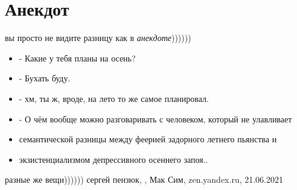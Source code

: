  
 
 
 
 
\chapter{Анекдот}
\label{sec:slova.anekdot}

вы просто не видите разницу
как в \emph{анекдоте}))))))
\begin{itemize}
  \item - Какие у тебя планы на осень?
  \item - Бухать буду.
  \item - хм, ты ж, вроде, на лето то же самое планировал.
  \item - О чём вообще можно разговаривать с человеком, который не улавливает
  \item семантической разницы между феерией задорного летнего пьянства и
  \item экзистенциализмом депрессивного осеннего запоя..
\end{itemize}
разные же вещи))))))
сергей пензюк,
, 
Мак Сим, zen.yandex.ru, 21.06.2021

